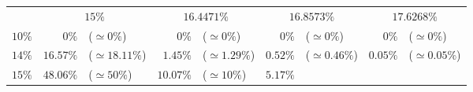 \documentclass[10pt]{report}
\begin{document}
\begin{exercice}
\begin{center}
\begin{tabular}{|c|rl|rl|rl|rl|}
    
    
    
    
    
    
    \\ \cline{2-9}

    
        
         & 
    \multicolumn{2}{c|}{$15\%$}
     & 
    \multicolumn{2}{c|}{$16.4471\%$}
     & 
    \multicolumn{2}{c|}{$16.8573\%$}
     & 
    \multicolumn{2}{c|}{$17.6268\%$}
    
    \\ \cline{1-9}

    
        $10\%$
         & 
    
        $0\%$
         & 
    
        ($\simeq0\%$)
         & 
    
        $0\%$
         & 
    
        ($\simeq0\%$)
         & 
    
        $0\%$
         & 
    
        ($\simeq0\%$)
         & 
    
        $0\%$
         & 
    
        ($\simeq0\%$)
        
    \\ 

    
        $14\%$
         & 
    
        $16.57\%$
         & 
    
        ($\simeq18.11\%$)
         & 
    
        $1.45\%$
         & 
    
        ($\simeq1.29\%$)
         & 
    
        $0.52\%$
         & 
    
        ($\simeq0.46\%$)
         & 
    
        $0.05\%$
         & 
    
        ($\simeq0.05\%$)
        
    \\ 

    
        $15\%$
         & 
    
        $48.06\%$
         & 
    
        ($\simeq50\%$)
         & 
    
        $10.07\%$
         & 
    
        ($\simeq10\%$)
         & 
    
        $5.17\%$
         & 
    

\end{tabular}
\end{center}
\end{exercice}
\end{document}
